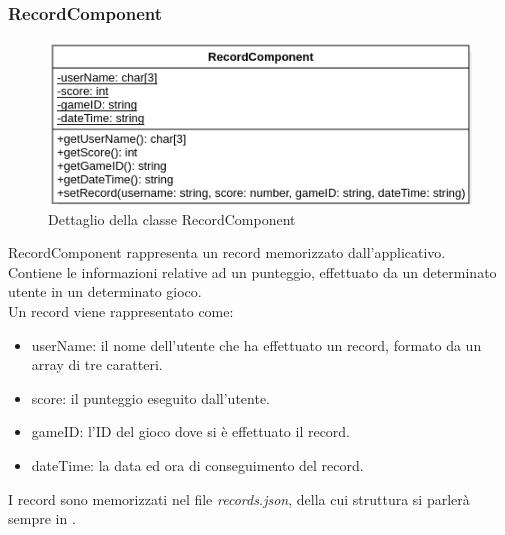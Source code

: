 \subsubsection{RecordComponent}
\label{subsec:recordComponent}
\begin{figure}[h]
    \centering
    \includegraphics[width=340pt]{images/prog/Record.png}
    \caption{Dettaglio della classe RecordComponent}
    \label{fig:recordComponent}
\end{figure}
RecordComponent rappresenta un record memorizzato dall'applicativo.\\ Contiene le informazioni relative ad un punteggio, effettuato da un determinato utente in un determinato gioco.\\
Un record viene rappresentato come:
\begin{itemize}
    \item userName: il nome dell'utente che ha effettuato un record, formato da un array di tre caratteri.
    \item score: il punteggio eseguito dall'utente.
    \item gameID: l'ID del gioco dove si è effettuato il record.
    \item dateTime: la data ed ora di conseguimento del record.
\end{itemize}
I record sono memorizzati nel file \emph{records.json}, della cui struttura si parlerà sempre in .
